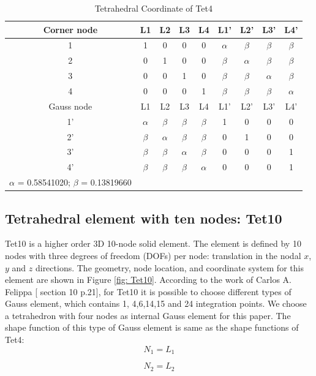 \begin{table}
	\centering
	\caption{Tetrahedral Coordinate of Tet4} \label{tab: Tet4}
	\begin{tabular}{ccccccccc}			
		\hline
		Corner node\centering& L1& L2& L3& L4& L1'& L2'& L3'& L4'\\ \hline
		1\centering& 1& 0& 0& 0& $\alpha$& $\beta$& $\beta$& $\beta$\\
		2\centering& 0& 1& 0& 0& $\beta$& $\alpha$& $\beta$& $\beta$\\
		3\centering& 0& 0& 1& 0& $\beta$& $\beta$& $\alpha$& $\beta$\\
		4\centering& 0& 0& 0& 1& $\beta$& $\beta$& $\beta$& $\alpha$\\
		\hline
		Gauss node\centering& L1& L2& L3& L4& L1'& L2'& L3'& L4' \\ \hline
		1'\centering& $\alpha$& $\beta$& $\beta$& $\beta$& 1& 0& 0& 0  \\
		2'\centering&$\beta$ & $\alpha$& $\beta$& $\beta$& 0& 1& 0& 0 \\
		3'\centering& $\beta$& $\beta$& $\alpha$& $\beta$& 0& 0& 0& 1\\
		4'\centering& $\beta$& $\beta$& $\beta$& $\alpha$& 0& 0& 0& 1\\
		\hline
		$\alpha$ = 0.58541020; $\beta$ = 0.13819660&&&&&&&&\\
		\hline 		    
	\end{tabular}	
\end{table}		

\subsection{Tetrahedral element with ten nodes: Tet10}
Tet10 is a higher order 3D 10-node solid element. The element is defined by 10 nodes with three degrees of freedom (DOFs) per node: translation in the nodal $x$, $y$ and $z$ directions. The geometry, node location, and coordinate system for this element are shown in Figure \ref{fig: Tet10}. According to the work of Carlos A. Felippa [\cite{Felippa} section 10 p.21], for Tet10 it is possible to choose different types of Gauss element, which contains 1, 4,6,14,15 and 24 integration points. We choose a tetrahedron with four nodes as internal Gauss element for this paper. The shape function of this type of Gauss element is same as the shape functions of Tet4:
\begin{equation}
N_1 = L_1
\end{equation}

\begin{equation}
N_2 = L_2
\end{equation}

